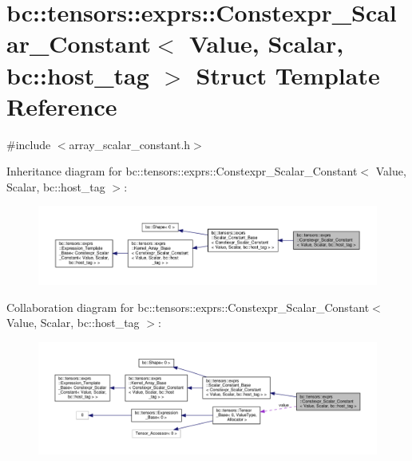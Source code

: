 \hypertarget{structbc_1_1tensors_1_1exprs_1_1Constexpr__Scalar__Constant_3_01Value_00_01Scalar_00_01bc_1_1host__tag_01_4}{}\section{bc\+:\+:tensors\+:\+:exprs\+:\+:Constexpr\+\_\+\+Scalar\+\_\+\+Constant$<$ Value, Scalar, bc\+:\+:host\+\_\+tag $>$ Struct Template Reference}
\label{structbc_1_1tensors_1_1exprs_1_1Constexpr__Scalar__Constant_3_01Value_00_01Scalar_00_01bc_1_1host__tag_01_4}


{\ttfamily \#include $<$array\+\_\+scalar\+\_\+constant.\+h$>$}



Inheritance diagram for bc\+:\+:tensors\+:\+:exprs\+:\+:Constexpr\+\_\+\+Scalar\+\_\+\+Constant$<$ Value, Scalar, bc\+:\+:host\+\_\+tag $>$\+:\nopagebreak
\begin{figure}[H]
\begin{center}
\leavevmode
\includegraphics[width=350pt]{structbc_1_1tensors_1_1exprs_1_1Constexpr__Scalar__Constant_3_01Value_00_01Scalar_00_01bc_1_1host__tag_01_4__inherit__graph}
\end{center}
\end{figure}


Collaboration diagram for bc\+:\+:tensors\+:\+:exprs\+:\+:Constexpr\+\_\+\+Scalar\+\_\+\+Constant$<$ Value, Scalar, bc\+:\+:host\+\_\+tag $>$\+:\nopagebreak
\begin{figure}[H]
\begin{center}
\leavevmode
\includegraphics[width=350pt]{structbc_1_1tensors_1_1exprs_1_1Constexpr__Scalar__Constant_3_01Value_00_01Scalar_00_01bc_1_1host__tag_01_4__coll__graph}
\end{center}
\end{figure}
